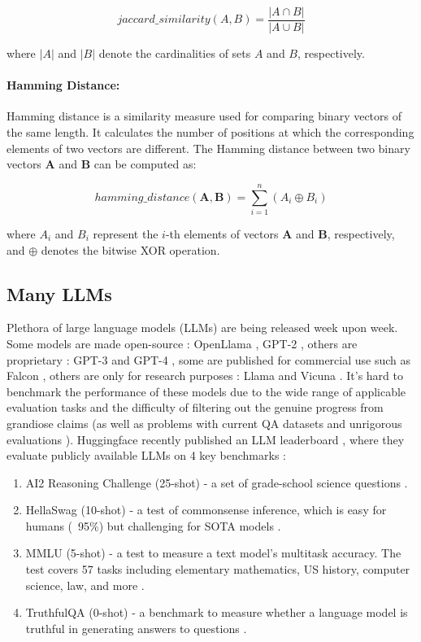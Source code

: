 \documentclass[a4paper,12pt]{article}
\begin{document}
$$
jaccard\_similarity(A, B) = \frac{|A \cap B|}{|A \cup B|}
$$

where $|A|$ and $|B|$ denote the cardinalities of sets $A$ and $B$, respectively.

\paragraph{Hamming Distance:}

Hamming distance \cite{hamming} is a similarity measure used for comparing binary vectors of the same length. It calculates the number of positions at which the corresponding elements of two vectors are different. The Hamming distance between two binary vectors $\mathbf{A}$ and $\mathbf{B}$ can be computed as:

$$
hamming\_distance(\mathbf{A}, \mathbf{B}) = \sum_{i=1}^{n} (A_i \oplus B_i)
$$

where $A_i$ and $B_i$ represent the $i$-th elements of vectors $\mathbf{A}$ and $\mathbf{B}$, respectively, and $\oplus$ denotes the bitwise XOR operation.

\subsection{Many LLMs}
Plethora of large language models (LLMs) are being released week upon week. Some models are made open-source : OpenLlama \cite{openllama}, GPT-2 \cite{gpt2}, others are proprietary : GPT-3\cite{gpt3} and GPT-4 \cite{gpt4}, some are published for commercial use such as Falcon \cite{falcon}, others are only for research purposes : Llama \cite{llama} and Vicuna \cite{vicuna}.
It's hard to benchmark the performance of these models due to the wide range of applicable evaluation tasks and the difficulty of filtering out the genuine progress from grandiose claims (as well as problems with current QA datasets and unrigorous evaluations \cite{unfairdataset}).
Huggingface recently published an LLM leaderboard \cite{open-llm-leaderboard}, where they evaluate publicly available LLMs on 4 key benchmarks : 

\begin{enumerate}
	\item AI2 Reasoning Challenge (25-shot) - a set of grade-school science questions \cite{AI2}.
	\item HellaSwag (10-shot) - a test of commonsense inference, which is easy for humans (~95\%) but challenging for SOTA models \cite{hellaswag}. 
	\item MMLU (5-shot) - a test to measure a text model’s multitask accuracy. The test covers 57 tasks including elementary mathematics, US history, computer science, law, and more \cite{MMLU}.
	\item TruthfulQA (0-shot) - a benchmark to measure whether a language model is truthful in generating answers to questions \cite{truthfulqa}.
\end{enumerate}
\end{document}
